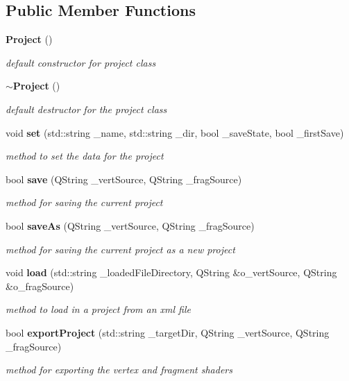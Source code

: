 \subsection*{Public Member Functions}
\begin{DoxyCompactItemize}
\item 
{\bf Project} ()
\begin{DoxyCompactList}\small\item\em default constructor for project class \end{DoxyCompactList}\item 
{\bf $\sim$\-Project} ()
\begin{DoxyCompactList}\small\item\em default destructor for the project class \end{DoxyCompactList}\item 
void {\bf set} (std\-::string \-\_\-name, std\-::string \-\_\-dir, bool \-\_\-save\-State, bool \-\_\-first\-Save)
\begin{DoxyCompactList}\small\item\em method to set the data for the project \end{DoxyCompactList}\item 
bool {\bf save} (Q\-String \-\_\-vert\-Source, Q\-String \-\_\-frag\-Source)
\begin{DoxyCompactList}\small\item\em method for saving the current project \end{DoxyCompactList}\item 
bool {\bf save\-As} (Q\-String \-\_\-vert\-Source, Q\-String \-\_\-frag\-Source)
\begin{DoxyCompactList}\small\item\em method for saving the current project as a new project \end{DoxyCompactList}\item 
void {\bf load} (std\-::string \-\_\-loaded\-File\-Directory, Q\-String \&o\-\_\-vert\-Source, Q\-String \&o\-\_\-frag\-Source)
\begin{DoxyCompactList}\small\item\em method to load in a project from an xml file \end{DoxyCompactList}\item 
bool {\bf export\-Project} (std\-::string \-\_\-target\-Dir, Q\-String \-\_\-vert\-Source, Q\-String \-\_\-frag\-Source)
\begin{DoxyCompactList}\small\item\em method for exporting the vertex and fragment shaders \end{DoxyCompactList}\item 

\end{DoxyCompactItemize}
